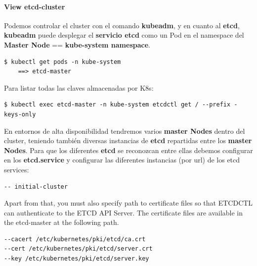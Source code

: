 \documentclass{article}
\newenvironment{codetemplate}[1][]{%
  \mybasecolorbox[#1]
  \itshape
}{%
  \endmybasecolorbox
}
\begin{document}
\paragraph{View etcd-cluster}

Podemos controlar el cluster con el comando \textbf{kubeadm}, y en cuanto al \textbf{etcd}, \textbf{kubeadm} puede desplegar el \textbf{servicio etcd} como un Pod en el namespace del \textbf{Master Node} == \textbf{kube-system namespace}.

\begin{codetemplate}{}
\begin{verbatim}
$ kubectl get pods -n kube-system
    ==> etcd-master
\end{verbatim}
\end{codetemplate}

Para listar todas las claves almacenadas por K8s:

\begin{codetemplate}{}
\begin{verbatim}
$ kubectl exec etcd-master -n kube-system etcdctl get / --prefix -keys-only
\end{verbatim}
\end{codetemplate}

En entornos de alta disponibilidad tendremos varios \textbf{master Nodes} dentro del cluster, teniendo también diversas instancias de \textbf{etcd} repartidas entre los \textbf{master Nodes}. Para que los diferentes \textbf{etcd} se reconozcan entre ellas debemos configurar en los \textbf{etcd.service} y configurar las diferentes instancias (por url) de los etcd services:

\begin{codetemplate}{}
\begin{verbatim}
-- initial-cluster
\end{verbatim}
\end{codetemplate}

Apart from that, you must also specify path to certificate files so that ETCDCTL can authenticate to the ETCD API Server. The certificate files are available in the etcd-master at the following path. 

\begin{codetemplate}{}
\begin{verbatim}
--cacert /etc/kubernetes/pki/etcd/ca.crt     
--cert /etc/kubernetes/pki/etcd/server.crt     
--key /etc/kubernetes/pki/etcd/server.key
\end{verbatim}
\end{codetemplate}
\end{document}
